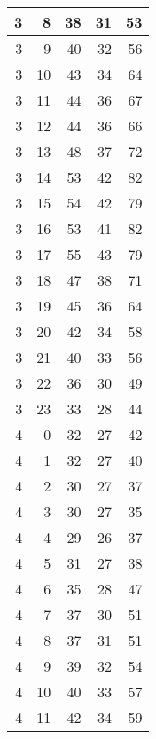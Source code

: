 \begin{longtable}{|r|r|r|r|r|}
    \hline
    3     & 8     & 38    & 31    & 53 \\
    \hline
    3     & 9     & 40    & 32    & 56 \\
    \hline
    3     & 10    & 43    & 34    & 64 \\
    \hline
    3     & 11    & 44    & 36    & 67 \\
    \hline
    3     & 12    & 44    & 36    & 66 \\
    \hline
    3     & 13    & 48    & 37    & 72 \\
    \hline
    3     & 14    & 53    & 42    & 82 \\
    \hline
    3     & 15    & 54    & 42    & 79 \\
    \hline
    3     & 16    & 53    & 41    & 82 \\
    \hline
    3     & 17    & 55    & 43    & 79 \\
    \hline
    3     & 18    & 47    & 38    & 71 \\
    \hline
    3     & 19    & 45    & 36    & 64 \\
    \hline
    3     & 20    & 42    & 34    & 58 \\
    \hline
    3     & 21    & 40    & 33    & 56 \\
    \hline
    3     & 22    & 36    & 30    & 49 \\
    \hline
    3     & 23    & 33    & 28    & 44 \\
    \hline
    4     & 0     & 32    & 27    & 42 \\
    \hline
    4     & 1     & 32    & 27    & 40 \\
    \hline
    4     & 2     & 30    & 27    & 37 \\
    \hline
    4     & 3     & 30    & 27    & 35 \\
    \hline
    4     & 4     & 29    & 26    & 37 \\
    \hline
    4     & 5     & 31    & 27    & 38 \\
    \hline
    4     & 6     & 35    & 28    & 47 \\
    \hline
    4     & 7     & 37    & 30    & 51 \\
    \hline
    4     & 8     & 37    & 31    & 51 \\
    \hline
    4     & 9     & 39    & 32    & 54 \\
    \hline
    4     & 10    & 40    & 33    & 57 \\
    \hline
    4     & 11    & 42    & 34    & 59 \\

\end{longtable}
